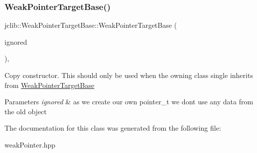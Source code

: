 \subsubsection{\texorpdfstring{Weak\+Pointer\+Target\+Base()}{WeakPointerTargetBase()}}
{\footnotesize\ttfamily jclib\+::\+Weak\+Pointer\+Target\+Base\+::\+Weak\+Pointer\+Target\+Base (\begin{DoxyParamCaption}\item[{\hyperlink{classjclib_1_1WeakPointerTargetBase}{Weak\+Pointer\+Target\+Base} const \&}]{ignored }\end{DoxyParamCaption})\hspace{0.3cm}{\ttfamily [inline]}, {\ttfamily [protected]}}

Copy constructor. This should only be used when the owning class single inherits from \hyperlink{classjclib_1_1WeakPointerTargetBase}{Weak\+Pointer\+Target\+Base} 
\begin{DoxyParams}{Parameters}
{\em ignored} & as we create our own pointer\+\_\+t we don\textquotesingle{}t use any data from the old object \\
\hline
\end{DoxyParams}


The documentation for this class was generated from the following file\+:\begin{DoxyCompactItemize}
\item 
weak\+Pointer.\+hpp\end{DoxyCompactItemize}
